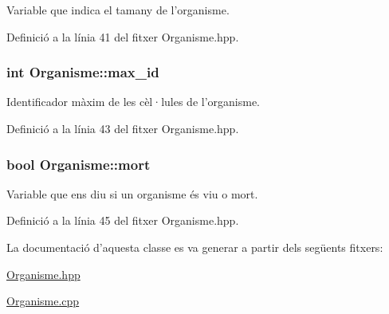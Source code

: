 Variable que indica el tamany de l'organisme. 



Definició a la línia 41 del fitxer Organisme.\-hpp.

\hypertarget{class_organisme_ae7f51a74f01cee155cf88a5b01545f78}{
\subsubsection[{max\-\_\-id}]{\setlength{\rightskip}{0pt plus 5cm}int Organisme\-::max\-\_\-id\hspace{0.3cm}{\ttfamily [private]}}}\label{class_organisme_ae7f51a74f01cee155cf88a5b01545f78}


Identificador màxim de les cèl·lules de l'organisme. 



Definició a la línia 43 del fitxer Organisme.\-hpp.

\hypertarget{class_organisme_ae20564db8d9ba5b7547750375010ed7b}{
\subsubsection[{mort}]{\setlength{\rightskip}{0pt plus 5cm}bool Organisme\-::mort\hspace{0.3cm}{\ttfamily [private]}}}\label{class_organisme_ae20564db8d9ba5b7547750375010ed7b}


Variable que ens diu si un organisme és viu o mort. 



Definició a la línia 45 del fitxer Organisme.\-hpp.



La documentació d'aquesta classe es va generar a partir dels següents fitxers\-:\begin{DoxyCompactItemize}
\item 
\hyperlink{_organisme_8hpp}{Organisme.\-hpp}\item 
\hyperlink{_organisme_8cpp}{Organisme.\-cpp}\end{DoxyCompactItemize}
